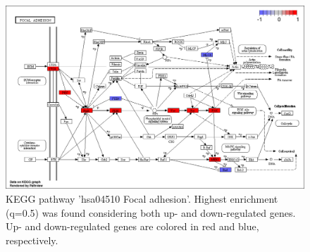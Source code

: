 \begin{figure}[!ht]
\begin{center}
\includegraphics{component-hsa04510.png}
\end{center}
\caption{KEGG pathway 'hsa04510 Focal adhesion'. Highest enrichment (q=0.5) was found considering both up- and down-regulated genes. Up- and down-regulated genes are colored in red and blue, respectively.}
\end{figure}
